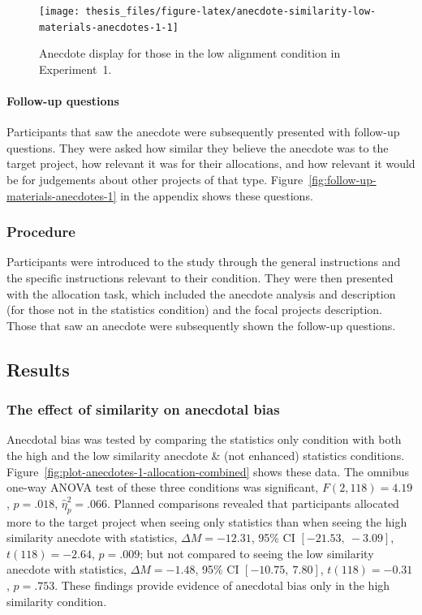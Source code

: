 \documentclass[a4paper, nobind, dvipsnames]{templates/ociamthesis}
\theoremstyle{definition}
\theoremstyle{definition}
\theoremstyle{definition}
\theoremstyle{definition}
\theoremstyle{remark}
\begin{document}
\begin{figure}
\texttt{[image: thesis\_files/figure-latex/anecdote-similarity-low-materials-anecdotes-1-1]} \caption{Anecdote display for those in the low alignment condition in Experiment~1.}\label{fig:anecdote-similarity-low-materials-anecdotes-1}
\end{figure}

\paragraph{Follow-up questions}

Participants that saw the anecdote were subsequently presented with follow-up
questions. They were asked how similar they believe the anecdote was to the
target project, how relevant it was for their allocations, and how relevant it
would be for judgements about other projects of that type.
Figure~\ref{fig:follow-up-materials-anecdotes-1} in the appendix shows these
questions.

\subsubsection{Procedure}

Participants were introduced to the study through the general instructions and
the specific instructions relevant to their condition. They were then presented
with the allocation task, which included the anecdote analysis and description
(for those not in the statistics condition) and the focal projects description.
Those that saw an anecdote were subsequently shown the follow-up questions.

\hypertarget{results-anecdotes-1}{%
\subsection{Results}\label{results-anecdotes-1}}

\subsubsection{The effect of similarity on anecdotal bias}

Anecdotal bias was tested by comparing the statistics only condition with both
the high and the low similarity anecdote \& (not enhanced) statistics conditions.
Figure~\ref{fig:plot-anecdotes-1-allocation-combined} shows these data. The
omnibus one-way ANOVA test of these three conditions was significant,
\(F(2, 118) = 4.19\), \(p = .018\), \(\hat{\eta}^2_p = .066\). Planned comparisons revealed that
participants allocated more to the target project when seeing only statistics
than when seeing the high similarity anecdote with statistics,
\(\Delta M = -12.31\), 95\% CI \([-21.53,~-3.09]\), \(t(118) = -2.64\), \(p = .009\); but not compared
to seeing the low similarity anecdote with statistics,
\(\Delta M = -1.48\), 95\% CI \([-10.75,~7.80]\), \(t(118) = -0.31\), \(p = .753\). These findings
provide evidence of anecdotal bias only in the high similarity condition.
\end{document}
